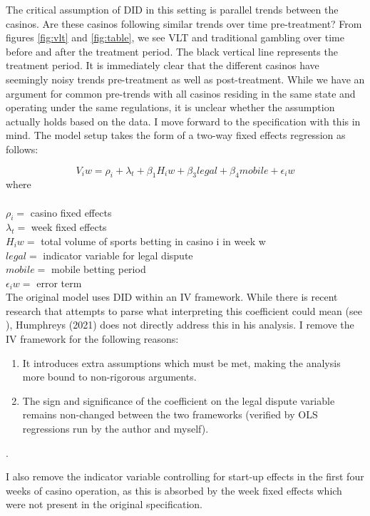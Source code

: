\documentclass{article}
\begin{document}
The critical assumption of DID in this setting is parallel trends between the casinos. Are these casinos following similar trends over time pre-treatment? From figures \ref{fig:vlt} and \ref{fig:table}, we see VLT and traditional gambling over time before and after the treatment period. The black vertical line represents the treatment period. It is immediately clear that the different casinos have seemingly noisy trends pre-treatment as well as post-treatment. While we have an argument for common pre-trends with all casinos residing in the same state and operating under the same regulations, it is unclear whether the assumption actually holds based on the data. I move forward to the specification with this in mind.
The model setup takes the form of a two-way fixed effects regression as follows:

\newpage
\begin{equation}
     V_iw = \rho_i + \lambda_t + \beta_1H_iw + \beta_3legal + \beta_4mobile + \epsilon_iw
\end{equation}
where\\
\\$\rho_i =$ casino fixed effects\\
$\lambda_t =$ week fixed effects\\
$H_iw =$ total volume of sports betting in casino i in week w\\
$legal =$ indicator variable for legal dispute\\
$mobile =$ mobile betting period\\
$\epsilon_iw =$ error term\\

The original model uses DID within an IV framework. While there is recent research that attempts to parse what interpreting this coefficient could mean (see \cite{deChaisemartin2017} \cite{https://doi.org/10.48550/arxiv.2011.03593}), Humphreys (2021\cite{Humphreys2021}) does not directly address this in his analysis. I remove the IV framework for the following reasons:
\begin{enumerate}
    \item It introduces extra assumptions which must be met, making the analysis more bound to non-rigorous arguments.
    \item The sign and significance of the coefficient on the legal dispute variable remains non-changed between the two frameworks (verified by OLS regressions run by the author and myself).
\end{enumerate}.

I also remove the indicator variable controlling for start-up effects in the first four weeks of casino operation, as this is absorbed by the week fixed effects which were not present in the original specification.
\end{document}
